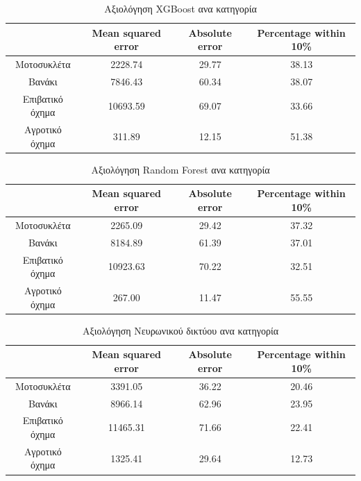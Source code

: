 \documentclass{llncs}
\begin{document}
\begin{table}[h]
    \centering
    \begin{tabular}{|c|c|c|c|} %
        \hline
         &Mean squared error & Absolute error & Percentage within 10\% \\ %
        \hline
        Μοτοσυκλέτα & 2228.74 & 29.77 & 38.13 \\
        Βανάκι & 7846.43 & 60.34 & 38.07 \\
        Επιβατικό όχημα & 10693.59 & 69.07 & 33.66 \\
        Αγροτικό όχημα & 311.89 & 12.15 & 51.38 \\
        \hline
    \end{tabular}
    \caption{Αξιολόγηση XGBoost ανα κατηγορία}
    \label{tab:XGBoost_cat_individual}
\end{table}

\begin{table}[h]
    \centering
    \begin{tabular}{|c|c|c|c|} %
        \hline
         &Mean squared error & Absolute error & Percentage within 10\% \\ %
        \hline
        Μοτοσυκλέτα & 2265.09 & 29.42 & 37.32 \\
        Βανάκι & 8184.89 & 61.39 & 37.01 \\
        Επιβατικό όχημα & 10923.63 & 70.22 & 32.51 \\
        Αγροτικό όχημα & 267.00 & 11.47 & 55.55 \\
        \hline
    \end{tabular}
    \caption{Αξιολόγηση Random Forest ανα κατηγορία}
    \label{tab:RandomForest_cat_individual}
\end{table}

\begin{table}[h]
    \centering
    \begin{tabular}{|c|c|c|c|} %
        \hline
         &Mean squared error & Absolute error & Percentage within 10\% \\ %
        \hline
        Μοτοσυκλέτα & 3391.05 & 36.22 & 20.46 \\
        Βανάκι & 8966.14 & 62.96 & 23.95 \\
        Επιβατικό όχημα & 11465.31 & 71.66 & 22.41 \\
        Αγροτικό όχημα & 1325.41 & 29.64 & 12.73 \\
        \hline
    \end{tabular}
    \caption{Αξιολόγηση Νευρωνικού δικτύου ανα κατηγορία}
    \label{tab:neural_network_cat_individual}
\end{table}
\end{document}
